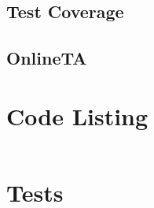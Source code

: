 \documentclass[12pt,a4paper]{article}
\begin{document}
\subsection{Test Coverage}

\subsection{OnlineTA}



\appendix
\section{Code Listing}

\inputminted{haskell}{handout/src/Parser/Impl.hs}

\section{Tests}

\inputminted{haskell}{handout/tests/Test.hs}
\end{document}
